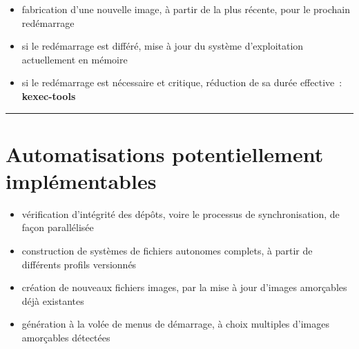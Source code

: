 \documentclass[10pt]{article}
\newcommand{\hr}{\rule{\textwidth}{1pt}}
\newenvironment{itmz}{\begin{itemize}
\setlength{\itemsep}{0em}
}{\end{itemize}}
\begin{document}
\begin{itmz}
\item{fabrication d’une nouvelle image, à partir de la plus récente, pour le prochain redémarrage}
\item{si le redémarrage est différé, mise à jour du système d’exploitation actuellement en mémoire}
\item{si le redémarrage est nécessaire et critique, réduction de sa durée effective : \textbf{kexec-tools}}
\end{itmz}

\hr

\section{Automatisations potentiellement implémentables}

\begin{itmz}
\item{vérification d’intégrité des dépôts, voire le processus de synchronisation, de façon parallélisée}
\item{construction de systèmes de fichiers autonomes complets, à partir de différents profils versionnés}
\item{création de nouveaux fichiers images, par la mise à jour d’images amorçables déjà existantes}
\item{génération à la volée de menus de démarrage, à choix multiples d’images amorçables détectées}
\end{itmz}
\end{document}
